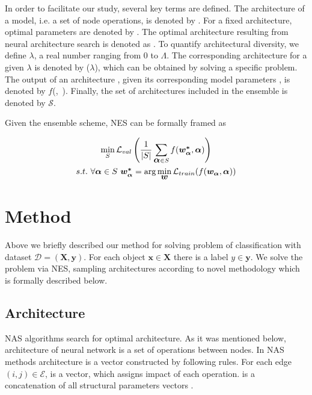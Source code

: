 \documentclass{article}
\begin{document}
In order to facilitate our study, several key terms are defined. The architecture of a model, i.e. a set of node operations, is denoted by \mbox{\boldmath{$\alpha$}}. For a fixed architecture, optimal parameters are denoted by \mbox{}.
The optimal architecture resulting from neural architecture search is denoted as \mbox{\boldmath{$\alpha^*$}}. 
To quantify architectural diversity, we define $\lambda$, a real number ranging from 0 to $\Lambda$.
The corresponding architecture for a given $\lambda$ is denoted by \mbox{\boldmath{$\alpha$}}($\lambda$), which can be obtained by solving a specific problem.
The output of an architecture \mbox{\boldmath{$\alpha$}}, given its corresponding model parameters \mbox{}, is denoted by $f$(\mbox{},~\mbox{\boldmath{$\alpha$}}).
Finally, the set of architectures included in the ensemble is denoted by $\mathcal{S}$.

Given the ensemble scheme, NES can be formally framed as

\begin{gather*}
	\min_S \mathcal{L}_{val}\left(\frac{1}{|S|}\sum_{\mbox{\boldmath{$\alpha$}} \in S}f(\mbox{\boldmath{$w_\alpha^*$}}, \mbox{\boldmath{$\alpha$}})\right) \\
s.t. \text{ }\forall \mbox{\boldmath{$\alpha$}} \in S \text{ } \mbox{\boldmath{$w_\alpha^*$}} = \arg \min_{\mbox{\boldmath{$w$}}} \mathcal{L}_{train}(f(\mbox{\boldmath{$w_\alpha$}}, \mbox{\boldmath{$\alpha$}}))
\end{gather*}

\section{Method}

Above we briefly described our method for solving problem of classification with dataset $\mathcal{D} = (\mathbf{X}, \mathbf{y})$. For each object $\mathbf{x} \in \mathbf{X}$ there is a label $y \in \mathbf{y}$. We solve the problem via NES, sampling architectures according to novel methodology which is formally described below.

\subsection{Architecture}

NAS algorithms search for optimal architecture. 
As it was mentioned below, architecture of neural network is a set of operations between nodes. In NAS methods architecture is a vector constructed by following rules. For each edge $(i, j) \in \mathcal{E}$, \mbox{} is a vector, which assigns impact of each operation.
\mbox{\boldmath{$\alpha$}} is a concatenation of all structural parameters vectors \mbox{}.
\end{document}

